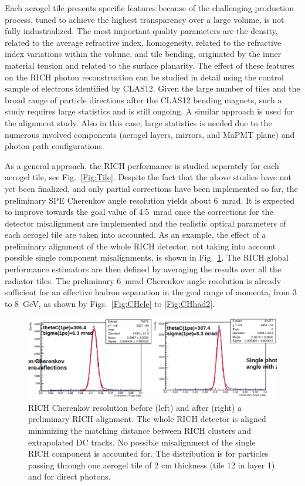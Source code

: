 \documentclass[5p,times,twocolumn]{elsarticle}
\begin{document}
Each aerogel tile presents specific features because of the challenging production process, tuned to achieve the
highest transparency over a large volume, is not fully industrialized. The most important quality parameters are the
density, related to the average refractive index, homogeneity, related to the refractive index variations within the
volume, and tile bending, originated by the inner material tension and related to the surface planarity. The effect of
these features on the RICH photon reconstruction can be studied in detail using the control sample of electrons
identified by CLAS12. Given the large number of tiles and the broad range of particle directions after the CLAS12
bending magnets, such a study requires large statistics and is still ongoing. A similar approach is used for the
alignment study. Also in this case, large statistics is needed due to the numerous involved components (aerogel
layers, mirrors, and MaPMT plane) and photon path configurations. 

As a general approach, the RICH performance is studied separately for each aerogel tile, see Fig.~\ref{Fig:Tile}.
Despite the fact that the above studies have not yet been finalized, and only partial corrections have been
implemented so far, the preliminary SPE Cherenkov angle resolution yields about 6~mrad. It is expected to improve
towards the goal value of 4.5~mrad once the corrections for the detector misalignment are implemented and the
realistic optical parameters of each aerogel tile are taken into accounted. As an example, the effect of a preliminary
alignment of the whole RICH detector, not taking into account possible single component misalignments, is shown in
Fig.~\ref{Fig:Align}. The RICH global performance estimators are then defined by averaging the results over all the
radiator tiles. The preliminary 6~mrad Cherenkov angle resolution is already sufficient for an effective hadron
separation in the goal range of momenta, from 3 to 8~GeV, as shown by Figs.~\ref{Fig:CHele} to \ref{Fig:CHhad2}.

\begin{figure}[t]
\begin{center}
\includegraphics[width=1.0\columnwidth]{Reso_align.png}
\end{center}
\caption{RICH Cherenkov resolution before (left) and after (right) a preliminary RICH alignment. The whole RICH
  detector is aligned minimizing the matching distance between RICH clusters and extrapolated DC tracks. No
  possible misalignment of the single RICH component is accounted for. The distribution is for particles passing through
  one aerogel tile of 2 cm thickness (tile 12 in layer 1) and for direct photons.}
\label{Fig:Align}
\end{figure}
\end{document}
